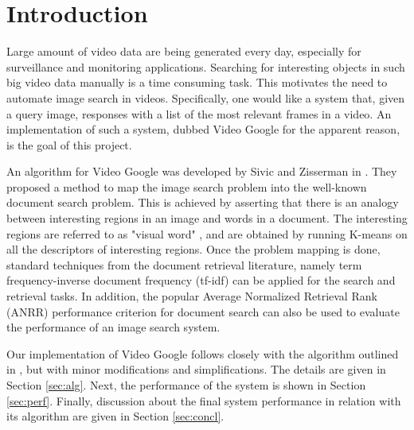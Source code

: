 \documentclass[conference]{IEEEtran}
\begin{document}

\section{Introduction}
\label{sec:intro}
Large amount of video data are being generated every day, especially for surveillance and monitoring applications. 
Searching for interesting objects in such big video data manually is a time consuming task. This motivates the need to automate image 
search in videos. Specifically, one would like a system that, given a query image, responses with a list of the most relevant frames in a video.
An implementation of such a system, dubbed Video Google for the apparent reason, is the goal of this project.

An algorithm for Video Google was developed by Sivic and Zisserman in \cite{sivic2003video}. They proposed a method to map the image
search problem into the well-known document search problem. This is achieved by asserting that there is an analogy between 
interesting regions in an image and words in a document. The interesting regions are referred to as "visual word" \cite{sivic2003video},
and are obtained by running K-means on all the descriptors of interesting regions. Once the problem mapping is done, standard techniques
from the document retrieval literature, namely term frequency-inverse document frequency (tf-idf) \cite{salton1983introduction, salton1988term}
can be applied for the search and retrieval tasks. In addition, the popular Average Normalized Retrieval Rank (ANRR) \cite{muller2002truth} performance criterion for document search can also be used to evaluate the performance of an image search system.

Our  implementation of Video Google follows closely with the algorithm outlined in \cite{sivic2003video}, but with minor modifications and simplifications.
The details are given in Section \ref{sec:alg}. Next, the performance of the system is shown in Section \ref{sec:perf}. Finally, discussion about the 
final system performance in relation with its algorithm are given in Section \ref{sec:concl}.
\end{document}
